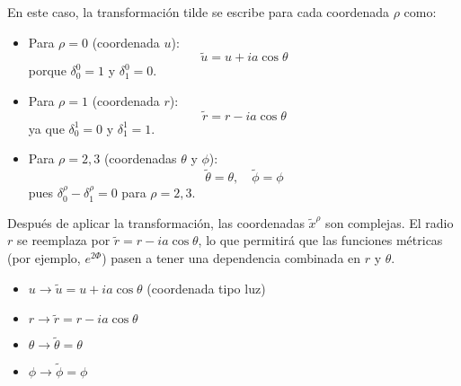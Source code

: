 \begin{enumerate}[1.]
          En este caso, la transformación tilde se escribe para cada coordenada $\rho$ como:

          \begin{itemize}
              \item Para $\rho = 0$ (coordenada $u$):
                    \begin{equation}
                        \tilde{u} = u + i a \cos \theta
                    \end{equation}
                    porque $\delta_0^0 = 1$ y $\delta_1^0 = 0$.

              \item Para $\rho = 1$ (coordenada $r$):
                    \begin{equation}
                        \tilde{r} = r - i a \cos \theta
                    \end{equation}
                    ya que $\delta_0^1 = 0$ y $\delta_1^1 = 1$.

              \item Para $\rho = 2, 3$ (coordenadas $\theta$ y $\phi$):
                    \begin{equation}
                        \tilde{\theta} = \theta, \quad \tilde{\phi} = \phi
                    \end{equation}
                    pues $\delta_0^\rho - \delta_1^\rho = 0$ para $\rho = 2, 3$.
          \end{itemize}

          Después de aplicar la transformación, las coordenadas $\tilde{x}^\rho$ son complejas. El radio $r$ se reemplaza por $\tilde{r} = r - i a \cos \theta$, lo que permitirá que las funciones métricas (por ejemplo, $e^{2 \Phi}$) pasen a tener una dependencia combinada en $r$ y $\theta$.

          \begin{itemize}
              \item $u \rightarrow \tilde{u} = u + ia \cos \theta$ (coordenada tipo luz)
              \item $r \rightarrow \tilde{r} = r - i a \cos \theta$
              \item $\theta \rightarrow \tilde{\theta} = \theta$
              \item $\phi \rightarrow \tilde{\phi} = \phi$
          \end{itemize}


\end{enumerate}
